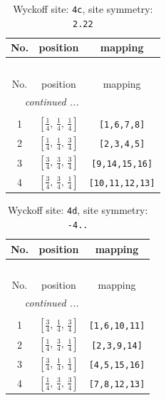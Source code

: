 \documentclass[fleqn,8pt]{jsarticle}
\begin{document}
\renewcommand{\arraystretch}{1.2}
\begin{longtable}{ccc}
\caption{Wyckoff site: {\tt 4c}, site symmetry: {\tt 2.22}}
 \\
 \hline \hline
No. & position & mapping \\ \hline \endfirsthead

\multicolumn{2}{l}{\tablename\ \thetable{}} \\
 \hline \hline
No. & position & mapping \\ \hline \endhead

 \hline \hline
\multicolumn{2}{r}{\footnotesize\it continued ...} \\ \endfoot

 \hline \hline
\multicolumn{2}{r}{} \\ \endlastfoot

1 & $\left[ \frac{1}{4},\, \frac{1}{4},\, \frac{1}{4} \right]$ & {\tt [1,6,7,8]} \\ \hline
2 & $\left[ \frac{1}{4},\, \frac{1}{4},\, \frac{3}{4} \right]$ & {\tt [2,3,4,5]} \\ \hline
3 & $\left[ \frac{3}{4},\, \frac{3}{4},\, \frac{3}{4} \right]$ & {\tt [9,14,15,16]} \\ \hline
4 & $\left[ \frac{3}{4},\, \frac{3}{4},\, \frac{1}{4} \right]$ & {\tt [10,11,12,13]} \\
\end{longtable}
\renewcommand{\arraystretch}{1.2}
\begin{longtable}{ccc}
\caption{Wyckoff site: {\tt 4d}, site symmetry: {\tt -4..}}
 \\
 \hline \hline
No. & position & mapping \\ \hline \endfirsthead

\multicolumn{2}{l}{\tablename\ \thetable{}} \\
 \hline \hline
No. & position & mapping \\ \hline \endhead

 \hline \hline
\multicolumn{2}{r}{\footnotesize\it continued ...} \\ \endfoot

 \hline \hline
\multicolumn{2}{r}{} \\ \endlastfoot

1 & $\left[ \frac{3}{4},\, \frac{1}{4},\, \frac{3}{4} \right]$ & {\tt [1,6,10,11]} \\ \hline
2 & $\left[ \frac{1}{4},\, \frac{3}{4},\, \frac{1}{4} \right]$ & {\tt [2,3,9,14]} \\ \hline
3 & $\left[ \frac{3}{4},\, \frac{1}{4},\, \frac{1}{4} \right]$ & {\tt [4,5,15,16]} \\ \hline
4 & $\left[ \frac{1}{4},\, \frac{3}{4},\, \frac{3}{4} \right]$ & {\tt [7,8,12,13]} \\
\end{longtable}
\end{document}
